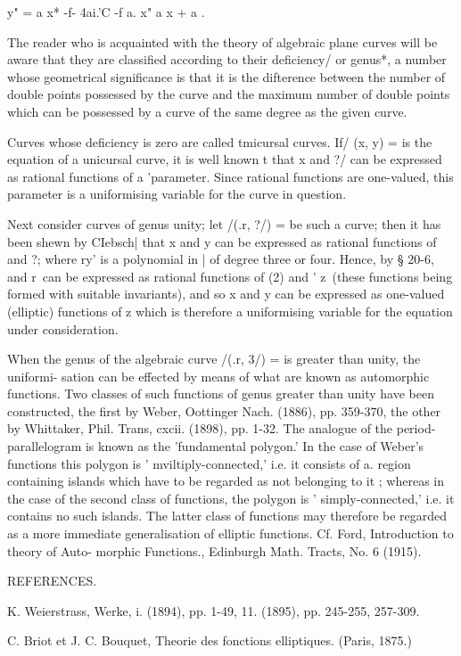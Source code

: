 {y" = a x* -f- 4ai.'C -f a. x" a x + a .

The reader who is acquainted with the theory of algebraic plane curves
will be aware that they are classified according to their deficiency/
or genus*, a number whose geometrical significance is that it is the
difterence between the number of double points possessed by the curve
and the maximum number of double points which can be possessed by a
curve of the same degree as the given curve.

Curves whose deficiency is zero are called tmicursal curves. If/ (x,
y) = is the equation of a unicursal curve, it is well known t that x
and ?/ can be expressed as rational functions of a 'parameter. Since
rational functions are one-valued, this parameter is a uniformising
variable for the curve in question.

Next consider curves of genus unity; let /(.r, ?/) = be such a curve;
then it has been shewn by CIebsch| that x and y can be expressed as
rational functions of and ?; where ry' is a polynomial in | of degree
three or four. Hence, by § 20-6, and r\ can be expressed as rational
functions of (2) and ' z\ (these functions being formed with suitable
invariants), and so x and y can be expressed as one-valued (elliptic)
functions of z which is therefore a uniformising variable for the
equation under consideration.

When the genus of the algebraic curve /(.r, 3/) = is greater than
unity, the uniformi- sation can be effected by means of what are known
as automorphic functions. Two classes of such functions of genus
greater than unity have been constructed, the first by Weber,
Oottinger Nach. (1886), pp. 359-370, the other by Whittaker, Phil.
Trans, cxcii. (1898), pp. 1-32. The analogue of the
period-parallelogram is known as the 'fundamental polygon.' In the
case of Weber's functions this polygon is ' mviltiply-connected,' i.e.
it consists of a. region containing islands which have to be regarded
as not belonging to it ; whereas in the case of the second class of
functions, the polygon is ' simply-connected,' i.e. it contains no
such islands. The latter class of functions may therefore be regarded
as a more immediate generalisation of elliptic functions. Cf. Ford,
Introduction to theory of Auto- morphic Functions., Edinburgh Math.
Tracts, No. 6 (1915).

REFERENCES.

K. Weierstrass, Werke, i. (1894), pp. 1-49, 11. (1895), pp. 245-255,
257-309.

C. Briot et J. C. Bouquet, Theorie des fonctions elliptiques. (Paris,
1875.)

}
